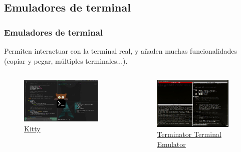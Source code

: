 \documentclass[aspectratio=43]{beamer}
\begin{document}
\subsection{Emuladores de terminal}
\begin{frame}
    \frametitle{Emuladores de terminal}
    Permiten interactuar con la terminal real, y añaden muchas funcionalidades (copiar y pegar, múltiples terminales...).\newline
    
    \begin{columns}[c]
        \begin{column}{0.5\textwidth}
            \begin{figure}
                \centering
                \includegraphics[width=0.9\textwidth]{img/kitty_terminal.jpg}
                \caption{\href{https://sw.kovidgoyal.net/kitty/}{Kitty}}
            \end{figure}
        \end{column}
        \begin{column}{0.5\textwidth}
            \begin{figure}
                \centering
                \includegraphics[width=0.9\textwidth]{img/terminator_terminal.jpg}
                \caption{\href{https://gnome-terminator.org/}{Terminator Terminal Emulator}}
            \end{figure}
        \end{column}
    \end{columns}

\end{frame}
\end{document}

